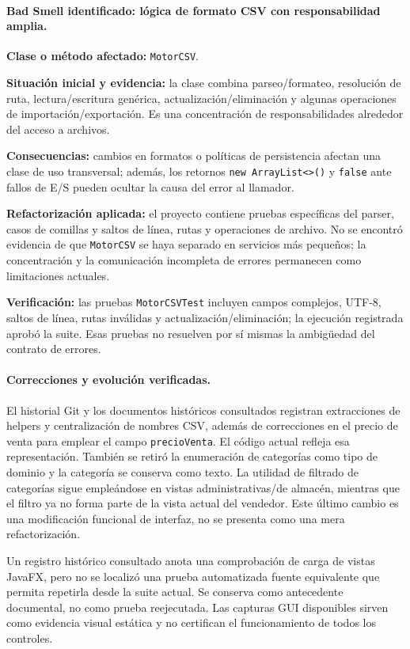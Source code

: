 \paragraph{Bad Smell identificado: lógica de formato CSV con responsabilidad amplia.}
\textbf{Clase o método afectado:} \texttt{MotorCSV}.

\textbf{Situación inicial y evidencia:} la clase combina parseo/formateo, resolución de ruta, lectura/escritura genérica, actualización/eliminación y algunas operaciones de importación/exportación. Es una concentración de responsabilidades alrededor del acceso a archivos.

\textbf{Consecuencias:} cambios en formatos o políticas de persistencia afectan una clase de uso transversal; además, los retornos \texttt{new ArrayList<>()} y \texttt{false} ante fallos de E/S pueden ocultar la causa del error al llamador.

\textbf{Refactorización aplicada:} el proyecto contiene pruebas específicas del parser, casos de comillas y saltos de línea, rutas y operaciones de archivo. No se encontró evidencia de que \texttt{MotorCSV} se haya separado en servicios más pequeños; la concentración y la comunicación incompleta de errores permanecen como limitaciones actuales.

\textbf{Verificación:} las pruebas \texttt{MotorCSVTest} incluyen campos complejos, UTF-8, saltos de línea, rutas inválidas y actualización/eliminación; la ejecución registrada aprobó la suite. Esas pruebas no resuelven por sí mismas la ambigüedad del contrato de errores.

\paragraph{Correcciones y evolución verificadas.}
El historial Git y los documentos históricos consultados registran extracciones de helpers y centralización de nombres CSV, además de correcciones en el precio de venta para emplear el campo \texttt{precioVenta}. El código actual refleja esa representación. También se retiró la enumeración de categorías como tipo de dominio y la categoría se conserva como texto. La utilidad de filtrado de categorías sigue empleándose en vistas administrativas/de almacén, mientras que el filtro ya no forma parte de la vista actual del vendedor. Este último cambio es una modificación funcional de interfaz, no se presenta como una mera refactorización.

Un registro histórico consultado anota una comprobación de carga de vistas JavaFX, pero no se localizó una prueba automatizada fuente equivalente que permita repetirla desde la suite actual. Se conserva como antecedente documental, no como prueba reejecutada. Las capturas GUI disponibles sirven como evidencia visual estática y no certifican el funcionamiento de todos los controles.
